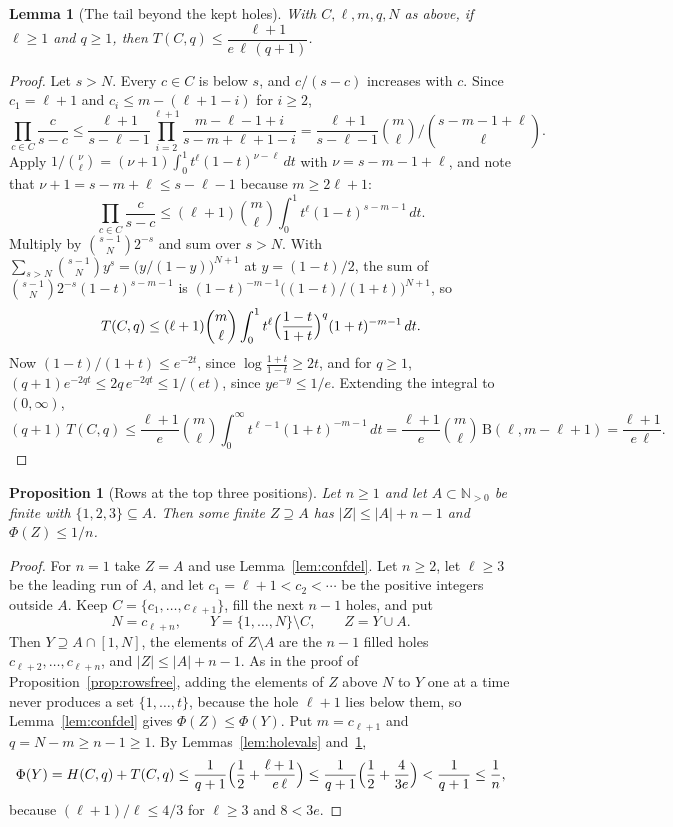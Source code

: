 \documentclass[11pt]{article}
\newtheorem{lemma}[theorem]{Lemma}
\newtheorem{proposition}[theorem]{Proposition}
\newcommand{\N}{\mathbb N}
\begin{document}
\begin{lemma}[The tail beyond the kept holes]\label{lem:holetail}
With $C,\ell,m,q,N$ as above, if $\ell\ge1$ and $q\ge1$, then $T(C,q)\le\dfrac{\ell+1}{e\,\ell\,(q+1)}$.
\end{lemma}

\begin{proof}
Let $s>N$.  Every $c\in C$ is below $s$, and $c/(s-c)$ increases with $c$.
Since $c_1=\ell+1$ and $c_i\le m-(\ell+1-i)$ for $i\ge2$,
\[
  \prod_{c\in C}\frac c{s-c}
  \le\frac{\ell+1}{s-\ell-1}\prod_{i=2}^{\ell+1}\frac{m-\ell-1+i}{s-m+\ell+1-i}
  =\frac{\ell+1}{s-\ell-1}\binom m\ell\Big/\binom{s-m-1+\ell}\ell .
\]
Apply $1/\binom\nu \ell=(\nu+1)\int_0^1t^\ell(1-t)^{\nu-\ell}\,dt$ with $\nu=s-m-1+\ell$, and
note that $\nu+1=s-m+\ell\le s-\ell-1$ because $m\ge2\ell+1$:
\[
  \prod_{c\in C}\frac c{s-c}\le(\ell+1)\binom m\ell\int_0^1t^\ell(1-t)^{s-m-1}\,dt .
\]
Multiply by $\binom{s-1}N2^{-s}$ and sum over $s>N$.  With
$\sum_{s>N}\binom{s-1}N y^s=\bigl(y/(1-y)\bigr)^{N+1}$ at $y=(1-t)/2$, the
sum of $\binom{s-1}N2^{-s}(1-t)^{s-m-1}$ is
$(1-t)^{-m-1}\bigl((1-t)/(1+t)\bigr)^{N+1}$, so
\[
  T(C,q)\le(\ell+1)\binom m\ell\int_0^1t^\ell
     \Bigl(\frac{1-t}{1+t}\Bigr)^q(1+t)^{-m-1}\,dt .
\]
Now $(1-t)/(1+t)\le e^{-2t}$, since $\log\frac{1+t}{1-t}\ge2t$, and for
$q\ge1$, $(q+1)e^{-2qt}\le2q\,e^{-2qt}\le1/(et)$, since $ye^{-y}\le1/e$.
Extending the integral to $(0,\infty)$,
\[
  (q+1)\,T(C,q)\le\frac{\ell+1}e\binom m\ell\int_0^\infty t^{\ell-1}(1+t)^{-m-1}\,dt
  =\frac{\ell+1}e\binom m\ell\,\mathrm B(\ell,m-\ell+1)=\frac{\ell+1}{e\,\ell}.
\]
\end{proof}

\begin{proposition}[Rows at the top three positions]\label{prop:rowstop}
Let $n\ge1$ and let $A\subset\N_{>0}$ be finite with $\{1,2,3\}\subseteq A$.
Then some finite $Z\supseteq A$ has $|Z|\le|A|+n-1$ and $\Phi(Z)\le1/n$.
\end{proposition}

\begin{proof}
For $n=1$ take $Z=A$ and use Lemma~\ref{lem:confdel}.  Let $n\ge2$, let
$\ell\ge3$ be the leading run of $A$, and let $c_1=\ell+1<c_2<\cdots$ be the
positive integers outside $A$.  Keep $C=\{c_1,\ldots,c_{\ell+1}\}$, fill the
next $n-1$ holes, and put
\[
  N=c_{\ell+n},\qquad Y=\{1,\ldots,N\}\setminus C,\qquad Z=Y\cup A .
\]
Then $Y\supseteq A\cap[1,N]$, the elements of $Z\setminus A$ are the $n-1$
filled holes $c_{\ell+2},\ldots,c_{\ell+n}$, and $|Z|\le|A|+n-1$.  As in the proof
of Proposition~\ref{prop:rowsfree}, adding the elements of $Z$ above $N$ to
$Y$ one at a time never produces a set $\{1,\ldots,t\}$, because the hole
$\ell+1$ lies below them, so Lemma~\ref{lem:confdel} gives
$\Phi(Z)\le\Phi(Y)$.  Put $m=c_{\ell+1}$ and $q=N-m\ge n-1\ge1$.  By
Lemmas~\ref{lem:holevals} and~\ref{lem:holetail},
\[
  \Phi(Y)=H(C,q)+T(C,q)\le\frac1{q+1}\Bigl(\frac12+\frac{\ell+1}{e\,\ell}\Bigr)
  \le\frac1{q+1}\Bigl(\frac12+\frac4{3e}\Bigr)<\frac1{q+1}\le\frac1n,
\]
because $(\ell+1)/\ell\le4/3$ for $\ell\ge3$ and $8<3e$.
\end{proof}
\end{document}
